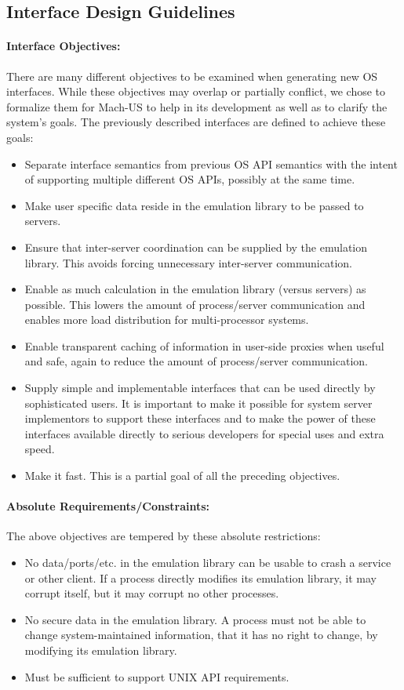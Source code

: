 \subsection{Interface Design Guidelines}
\paragraph{Interface Objectives:}
There are many different objectives to be examined when generating
new OS interfaces.  While these objectives
may overlap or partially conflict,  we chose
to formalize them for Mach-US to help in its development as well as to
clarify the system's goals.  The previously described interfaces are defined
to achieve these goals:
\begin{itemize}
\item Separate interface semantics from previous OS API semantics
with the intent of supporting multiple different OS APIs,
possibly at the same time.
\item Make user specific data reside in the emulation library
to be passed to servers.
\item Ensure that
inter-server coordination can be supplied by the emulation library.
This avoids forcing unnecessary inter-server communication.
\item Enable as much calculation in the 
emulation library (versus servers) as possible.
This lowers the amount of process/server communication and enables more load
distribution for multi-processor systems.
\item Enable transparent caching of information in user-side proxies when
useful and safe,
again to reduce the amount of process/server communication.
\item Supply simple and implementable interfaces that can be used
directly by sophisticated users.  It is important to make it possible for
system server implementors to support these interfaces and to make
the power of these interfaces available directly to serious developers
for special uses and extra speed.
\item Make it fast.  This is a partial goal of all the preceding objectives.
\end{itemize}
\paragraph{Absolute Requirements/Constraints:}
The above
objectives are tempered by these absolute restrictions:
\begin{itemize}
\item No data/ports/etc. in the emulation library can be usable to crash a
service or other client.  If a process directly modifies its emulation library,
it may corrupt itself, but it may corrupt no other processes.
\item No secure data in the emulation library.
A process must not be able to change system-maintained information, that
it has no right to change, by modifying its emulation library.
\item Must be sufficient to support UNIX API requirements.
\end{itemize}

